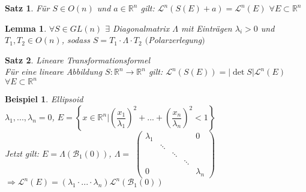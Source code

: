 \documentclass[11pt]{memoir}
\theoremstyle{changebreak}
\newtheorem{Beispiel}{Beispiel}[chapter]
\newtheorem{Lemma}{Lemma}[chapter]
\newtheorem{Satz}{Satz}[chapter]
\begin{document}
\begin{Satz}
Für $S \in O(n)$ und $a \in \mathbb R^n$ gilt:
$\mathscr L^n (S(E) +a) = \mathscr L^n(E)$ $\forall E \subset \mathbb R^n$
\end{Satz}


\begin{Lemma}
$\forall S \in GL(n)$ $\exists$ Diagonalmatrix $\Lambda$ mit Einträgen $\lambda_i > 0$ und $T_1, T_2 \in O(n)$, sodass $S = T_1\cdotp\Lambda\cdotp T_2$ $($Polarzerlegung$)$
\end{Lemma}


\begin{Satz}
\emph{Lineare Transformationsformel} \\
Für eine lineare Abbildung $S: \mathbb R^n \rightarrow \mathbb R^n$ gilt: $\mathscr L^n(S(E)) = |\det S| \mathscr L^n(E)$ $\forall E \subset \mathbb R^n$
\end{Satz}


\begin{Beispiel}
\emph{Ellipsoid} \\
$\lambda_1, ..., \lambda_n = 0$, $E = \left\{ x \in \mathbb R^n | \left( \dfrac{x_1}{\lambda_1} \right)^2 + ... + \left (\dfrac{x_n}{\lambda_n}\right)^2 < 1 \right\}$ \\
Jetzt gilt: $E = \Lambda(\mathscr B_1(0))$, $\Lambda =$
$\begin{pmatrix}
      \lambda_1 & 	 &	&	& 0 \\
      		 &  	\ddots \\
		 &	& \ddots \\
		 &	&	& \ddots \\
		 0 &	&	&	&	\lambda_n
\end{pmatrix}$
$\Rightarrow \mathscr L^n(E) = (\lambda_1 \cdotp ... \cdotp \lambda_n)\mathscr L^n(\mathscr B_1(0))$
\end{Beispiel}
\end{document}
